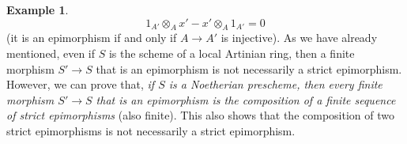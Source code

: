 \documentclass{article}
\theoremstyle{plain}
\theoremstyle{definition}
\newtheorem*{example*}{Example}
\begin{document}
\begin{example*}
  \[
    1_{A'}\otimes_A x' - x'\otimes_A 1_{A'} = 0
  \]
  (it is an epimorphism if and only if $A\to A'$ is injective).
  As we have already mentioned, even if $S$ is the scheme of a local Artinian ring, then a finite morphism $S'\to S$ that is an epimorphism is not necessarily a strict epimorphism.
  However, we can prove that, \emph{if $S$ is a Noetherian prescheme, then every finite morphism $S'\to S$ that is an epimorphism is the composition of a finite sequence of strict epimorphisms} (also finite).
  This also shows that the composition of two strict epimorphisms is not necessarily a strict epimorphism.
\end{example*}


\subsubsection{}
\label{A.2.c}
\end{document}
